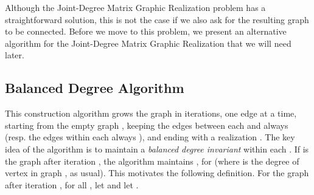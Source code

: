 \documentclass[12pt,a4paper]{article}
\theoremstyle{definition}
\theoremstyle{plain}
\begin{document}
Although the Joint-Degree Matrix Graphic Realization problem has a
straightforward solution, this is not the case if we also ask for the resulting 
graph to be connected. Before we move to this problem, we  present an 
alternative algorithm for the Joint-Degree Matrix Graphic Realization
that we will need later.



\subsection*{Balanced Degree Algorithm}



\label{sec:BalancedDegreeAlgorithm}

This construction algorithm grows the graph 
in iterations, one edge at a time, starting from the empty graph ,
keeping the edges between each  and  always  
(resp. the edges within each  always  ),
and ending with a realization .
The key idea of the algorithm is to
maintain a {\it balanced degree invariant}
within each .
If  is the graph after iteration ,
the algorithm maintains 
,
for  (where  is the
degree of vertex  in graph , as usual).
This motivates the following definition.
For the graph  after iteration ,
for all , 
let 
and let .
\end{document}
